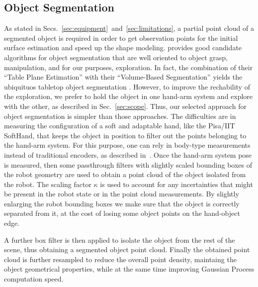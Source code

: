 \subsection{Object Segmentation}
\label{sec:segmentation}


As stated in Secs.~\ref{sec:equipment}~and~\ref{sec:limitations}, a partial point cloud
of a segmented object is required in order to get observation points for the initial
surface estimation and speed up the shape modeling.
\citet[Sec.~III.A]{Hudson2012Endtoend}  provides  good   candidate algorithms  for  object
segmentation  that are  well oriented  to  object grasp,  manipulation, and  for
our  purposes, exploration.  In fact,  the  combination of  their ``Table  Plane
Estimation''  with their  ``Volume-Based  Segmentation''  yields the  ubiquituos
tabletop object segmentation \citep{TabletopObjectDetector}. However, to improve
the  rechability  of the  exploration,  we  prefer to  hold  the  object in  one
hand-arm system and explore with the other, as described in Sec.~\ref{sec:scope}.
Thus,  our selected  approach  for  object segmentation  is  simpler than  those
approaches.  The  difficulties are  in  measuring  the  configuration of  a  soft
and  adaptable  hand, like the Pisa/IIT SoftHand,
that  keeps  the  object  in  position  to  filter  out
the  points  belonging  to  the  hand-arm system.  For  this  purpose,  one  can
rely in  body-type measurements  instead of  traditional encoders,  as described
in~\citet{Santaera2015Lowcost}.
Once the hand-arm  system pose is measured, then
some   passthrough filters with slightly  scaled bounding boxes of  the robot
geometry  are used  to obtain  a  point cloud  of  the object  isolated from  the
robot. The scaling factor $\kappa$ is used to account for any incertainties that might
be present in the robot state or in the point cloud measurements. 
By slightly enlarging the robot bounding boxes we make sure that the object is correctly
separated from it, at the cost of losing some object points on the hand-object edge.

A further box filter is then applied to isolate the object from the rest of the scene,
thus obtaining a segmented object point cloud. 
Finally the obtained point cloud is further resampled to reduce the overall point
density, maintaing the object geometrical properties, while at the same time
improving Gaussian Process computation speed. 

